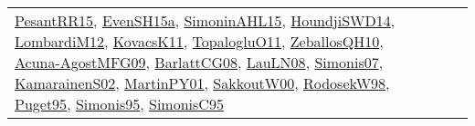 {\begin{longtable}{llp{6cm}p{6cm}p{6cm}}
\href{papers/PesantRR15.pdf}{PesantRR15}\cite{PesantRR15}, \href{articles/EvenSH15a.pdf}{EvenSH15a}\cite{EvenSH15a}, \href{articles/SimoninAHL15.pdf}{SimoninAHL15}\cite{SimoninAHL15}, \href{papers/HoundjiSWD14.pdf}{HoundjiSWD14}\cite{HoundjiSWD14}, \href{articles/LombardiM12.pdf}{LombardiM12}\cite{LombardiM12}, \href{articles/KovacsK11.pdf}{KovacsK11}\cite{KovacsK11}, \href{articles/TopalogluO11.pdf}{TopalogluO11}\cite{TopalogluO11}, \href{articles/ZeballosQH10.pdf}{ZeballosQH10}\cite{ZeballosQH10}, \href{papers/Acuna-AgostMFG09.pdf}{Acuna-AgostMFG09}\cite{Acuna-AgostMFG09}, \href{papers/BarlattCG08.pdf}{BarlattCG08}\cite{BarlattCG08}, \href{papers/LauLN08.pdf}{LauLN08}\cite{LauLN08}, \href{articles/Simonis07.pdf}{Simonis07}\cite{Simonis07}, \href{papers/KamarainenS02.pdf}{KamarainenS02}\cite{KamarainenS02}, \href{articles/MartinPY01.pdf}{MartinPY01}\cite{MartinPY01}, \href{articles/SakkoutW00.pdf}{SakkoutW00}\cite{SakkoutW00}, \href{papers/RodosekW98.pdf}{RodosekW98}\cite{RodosekW98}, \href{papers/Puget95.pdf}{Puget95}\cite{Puget95}, \href{papers/Simonis95.pdf}{Simonis95}\cite{Simonis95}, \href{papers/SimonisC95.pdf}{SimonisC95}\cite{SimonisC95}\\

\end{longtable}}
